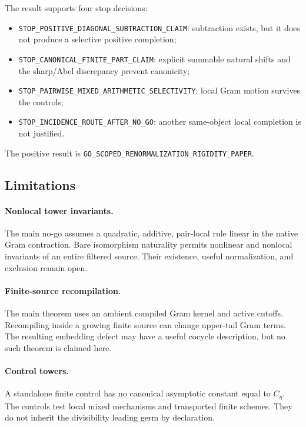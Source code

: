 The result supports four stop decisions:
\begin{itemize}
\item \texttt{STOP\_POSITIVE\_DIAGONAL\_SUBTRACTION\_CLAIM}: subtraction
exists, but it does not produce a selective positive completion;
\item \texttt{STOP\_CANONICAL\_FINITE\_PART\_CLAIM}: explicit summable
natural shifts and the sharp/Abel discrepancy prevent canonicity;
\item \texttt{STOP\_PAIRWISE\_MIXED\_ARITHMETIC\_SELECTIVITY}: local Gram
motion survives the controls;
\item \texttt{STOP\_INCIDENCE\_ROUTE\_AFTER\_NO\_GO}: another same-object
local completion is not justified.
\end{itemize}
The positive result is
\texttt{GO\_SCOPED\_RENORMALIZATION\_RIGIDITY\_PAPER}.

\subsection{Limitations}

\paragraph{Nonlocal tower invariants.}
The main no-go assumes a quadratic, additive, pair-local rule linear in the
native Gram contraction.  Bare isomorphism naturality permits nonlinear and
nonlocal invariants of an entire filtered source.  Their existence, useful
normalization, and exclusion remain open.

\paragraph{Finite-source recompilation.}
The main theorem uses an ambient compiled Gram kernel and active cutoffs.
Recompiling inside a growing finite source can change upper-tail Gram terms.
The resulting embedding defect may have a useful cocycle description, but no
such theorem is claimed here.

\paragraph{Control towers.}
A standalone finite control has no canonical asymptotic constant equal to
$C_\eta$.  The controls test local mixed mechanisms and transported finite
schemes.  They do not inherit the divisibility leading germ by declaration.

